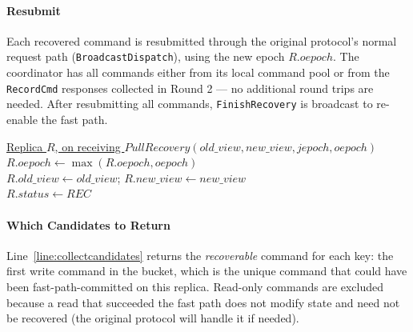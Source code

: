\documentclass[twocolumn]{article}
\begin{document}
\paragraph{Resubmit}
Each recovered command is resubmitted through the original protocol's normal request path (\texttt{BroadcastDispatch}), using the new epoch $R.oepoch$. The coordinator has all commands either from its local command pool or from the \texttt{RecordCmd} responses collected in Round 2 — no additional round trips are needed. After resubmitting all commands, \texttt{FinishRecovery} is broadcast to re-enable the fast path.



\begin{algorithm}
\caption{Server -- $OnPullRecovery$}
\label{alg:on_pull_recovery}
\setcounter{AlgoLine}{76}

\underline{Replica $R$, on receiving $PullRecovery(old\_view, new\_view, jepoch, oepoch)$}\\
$R.oepoch \gets \max(R.oepoch, oepoch)$\label{line:updateoepoch}\\
$R.old\_view \gets old\_view$; \; $R.new\_view \gets new\_view$\label{line:updateviews}\\
$R.status \gets REC$\label{line:setrec}\\
\end{algorithm}

\paragraph{Which Candidates to Return}
Line~\ref{line:collectcandidates} returns the \emph{recoverable} command for each key: the first write command in the bucket, which is the unique command that could have been fast-path-committed on this replica. Read-only commands are excluded because a read that succeeded the fast path does not modify state and need not be recovered (the original protocol will handle it if needed).
\end{document}

